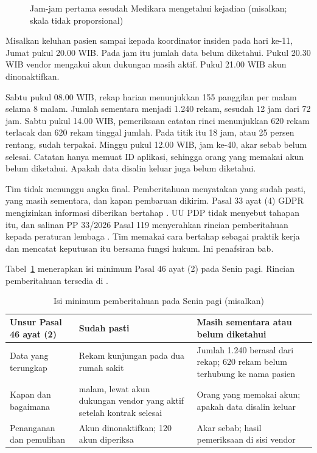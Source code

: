 \begin{figure}[!htb]
  \centering
  
  \caption{Jam-jam pertama sesudah Medikara mengetahui kejadian (misalkan; skala tidak
    proporsional)}
  \label{fig:ch07-jam-pertama}
\end{figure}

\begin{kasus}[title={Kasus Medikara Health: Jam-Jam Pertama Insiden 2025}]
Misalkan keluhan pasien sampai kepada koordinator insiden pada hari ke-11, Jumat pukul 20.00 WIB.
Pada jam itu jumlah data belum diketahui. Pukul 20.30 WIB vendor mengakui akun dukungan masih aktif.
Pukul 21.00 WIB akun dinonaktifkan.

Sabtu pukul 08.00 WIB, rekap harian menunjukkan 155 panggilan per malam selama 8 malam. Jumlah
sementara menjadi 1.240 rekam, sesudah 12 jam dari 72 jam. Sabtu pukul 14.00 WIB, pemeriksaan
catatan rinci menunjukkan 620 rekam terlacak dan 620 rekam tinggal jumlah. Pada titik itu 18 jam,
atau 25 persen rentang, sudah terpakai. Minggu pukul 12.00 WIB, jam ke-40, akar sebab belum selesai.
Catatan hanya memuat ID aplikasi, sehingga orang yang memakai akun belum diketahui. Apakah data
disalin keluar juga belum diketahui.

Tim tidak menunggu angka final. Pemberitahuan menyatakan yang sudah pasti, yang masih sementara, dan
kapan pembaruan dikirim. Pasal 33 ayat (4) GDPR mengizinkan informasi diberikan bertahap
\cite{c07-edpb-breach}. UU PDP tidak menyebut tahapan itu, dan salinan PP 33/2026 Pasal 119
menyerahkan rincian pemberitahuan kepada peraturan lembaga \cite{c03-pp33-nonresmi}. Tim memakai
cara bertahap sebagai praktik kerja dan mencatat keputusan itu bersama fungsi hukum. Ini penafsiran
bab.
\end{kasus}

Tabel~\ref{tab:ch07-isi} menerapkan isi minimum Pasal 46 ayat (2) pada Senin pagi. Rincian
pemberitahuan tersedia di .

\begin{table}[!htb]
  \centering\small
  \caption{Isi minimum pemberitahuan pada Senin pagi (misalkan)}\label{tab:ch07-isi}
  \begin{tabularx}{\textwidth}{|>{\raggedright\arraybackslash}p{}|>{\raggedright\arraybackslash}X|>{\raggedright\arraybackslash}X|}
    \hline
    \textbf{Unsur Pasal 46 ayat (2)} & \textbf{Sudah pasti} & \textbf{Masih sementara atau belum
    diketahui} \\ \hline
    Data yang terungkap & Rekam kunjungan pada dua rumah sakit & Jumlah 1.240 berasal dari rekap;
    620 rekam belum terhubung ke nama pasien \\ \hline
    Kapan dan bagaimana & 8 malam, lewat akun dukungan vendor yang aktif setelah kontrak selesai &
    Orang yang memakai akun; apakah data disalin keluar \\ \hline
    Penanganan dan pemulihan & Akun dinonaktifkan; 120 akun diperiksa & Akar sebab; hasil
    pemeriksaan di sisi vendor \\ \hline
  \end{tabularx}
\end{table}

